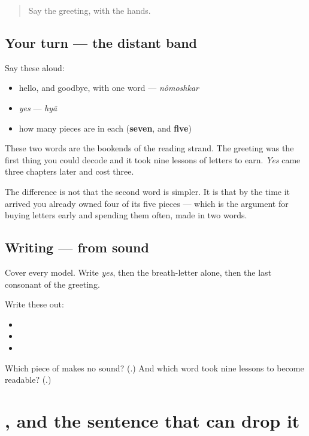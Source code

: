 \begin{quote}
Say the greeting, with the hands.
\end{quote}

\subsection*{Your turn — the distant band}
Say these aloud:

\begin{itemize}
\raggedright
  \item hello, and goodbye, with one word — \emph{nômoshkar}
  \item \emph{yes} — \emph{hyã}
  \item how many pieces are in each (\textbf{seven}, and \textbf{five})
\end{itemize}

These two words are the bookends of the reading strand. The greeting was the first thing you could decode and it took nine lessons of letters to earn. \emph{Yes} came three chapters later and cost three.

The difference is not that the second word is simpler. It is that by the time it arrived you already owned four of its five pieces — which is the argument for buying letters early and spending them often, made in two words.

\subsection*{Writing — from sound}
Cover every model. Write \emph{yes}, then the breath-letter alone, then the last consonant of the greeting.

Write these out:

\begin{itemize}
\raggedright
  \item {}
  \item {}
  \item {}
\end{itemize}

\begin{tcolorbox}[breakable,colback=teal!4,colframe=teal!35!black,title={Before you move on}]
Which piece of \textbf{} makes no sound? (\textbf{}.) And which word took nine lessons to become readable? (\textbf{}.)
\end{tcolorbox}
\section[Practice]{, and the sentence that can drop it}

